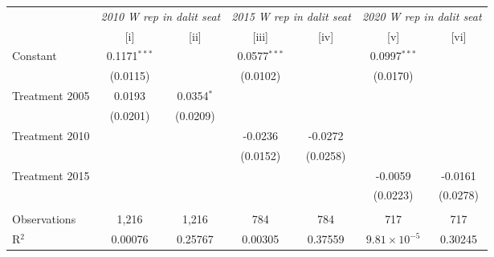 
\begingroup
\centering
\begin{tabular}{lcccccc}
   \toprule
    & \multicolumn{2}{c}{\textit{2010 W rep in dalit seat}} & \multicolumn{2}{c}{\textit{2015 W rep in dalit seat}} & \multicolumn{2}{c}{\textit{2020 W rep in dalit seat}}\\
                                                                     & [i]            & [ii]          & [iii]          & [iv]          & [v]                   & [vi]\\  
   \midrule 
   Constant                                                          & 0.1171$^{***}$ &               & 0.0577$^{***}$ &               & 0.0997$^{***}$        &   \\   
                                                                     & (0.0115)       &               & (0.0102)       &               & (0.0170)              &   \\   
   Treatment 2005                                                    & 0.0193         & 0.0354$^{*}$  &                &               &                       &   \\   
                                                                     & (0.0201)       & (0.0209)      &                &               &                       &   \\   
   Treatment  2010                                                   &                &               & -0.0236        & -0.0272       &                       &   \\   
                                                                     &                &               & (0.0152)       & (0.0258)      &                       &   \\   
   Treatment 2015                                                    &                &               &                &               & -0.0059               & -0.0161\\   
                                                                     &                &               &                &               & (0.0223)              & (0.0278)\\   
    \\
   Observations                                                      & 1,216          & 1,216         & 784            & 784           & 717                   & 717\\  
   R$^2$                                                             & 0.00076        & 0.25767       & 0.00305        & 0.37559       & $9.81\times 10^{-5}$  & 0.30245\\  

\end{tabular}
